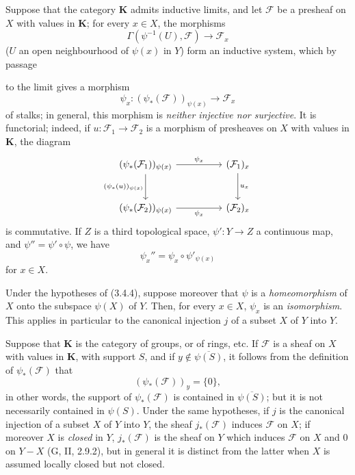 \begin{env}[3.4.4]
\label{0.3.4.4}
Suppose that the category $\mathbf{K}$ admits inductive limits, and let
$\mathcal{F}$ be a presheaf on $X$ with values in $\mathbf{K}$; for every
$x\in X$, the morphisms
\[
  \Gamma(\psi^{-1}(U),\mathcal{F})\to\mathcal{F}_x
\]
($U$ an open neighbourhood of $\psi(x)$ in $Y$) form an inductive system, which
by passage


to the limit gives a morphism
\[
  \psi_x:(\psi_*(\mathcal{F}))_{\psi(x)}\to\mathcal{F}_x
\]
of stalks; in general, this morphism is \emph{neither injective nor surjective}.
It is functorial; indeed, if
$u:\mathcal{F}_1\to\mathcal{F}_2$ is a morphism of presheaves on $X$ with
values in $\mathbf{K}$, the diagram
\[
\begin{tikzcd}[column sep=huge,row sep=large]
(\psi_*(\mathcal{F}_1))_{\psi(x)}
  \arrow[r,"\psi_x"] \arrow[d,"{(\psi_*(u))_{\psi(x)}}"']
  & (\mathcal{F}_1)_x \arrow[d,"u_x"] \\
(\psi_*(\mathcal{F}_2))_{\psi(x)}
  \arrow[r,"\psi_x"']
  & (\mathcal{F}_2)_x
\end{tikzcd}
\]
is commutative. If $Z$ is a third topological space,
$\psi':Y\to Z$ a continuous map, and $\psi''=\psi'\circ\psi$, we have
\[
  \psi_x''=\psi_x\circ\psi'_{\psi(x)}
\]
for $x\in X$.
\end{env}

\begin{env}[3.4.5]
\label{0.3.4.5}
Under the hypotheses of (3.4.4), suppose moreover that $\psi$ is a
\emph{homeomorphism} of $X$ onto the subspace $\psi(X)$ of $Y$. Then, for
every $x\in X$, $\psi_x$ is an \emph{isomorphism}. This applies in
particular to the canonical injection $j$ of a subset $X$ of $Y$ into $Y$.
\end{env}

\begin{env}[3.4.6]
\label{0.3.4.6}
Suppose that $\mathbf{K}$ is the category of groups, or of rings, etc.
If $\mathcal{F}$ is a sheaf on $X$ with values in $\mathbf{K}$, with
support $S$, and if $y\notin\overline{\psi(S)}$, it follows from the definition of
$\psi_*(\mathcal{F})$ that
\[
  (\psi_*(\mathcal{F}))_y=\{0\},
\]
in other words, the support of $\psi_*(\mathcal{F})$ is contained in
$\overline{\psi(S)}$; but it is not necessarily contained in
$\psi(S)$. Under the same hypotheses, if $j$ is the canonical injection of a
subset $X$ of $Y$ into $Y$, the sheaf $j_*(\mathcal{F})$ induces
$\mathcal{F}$ on $X$; if moreover $X$ is \emph{closed} in $Y$,
$j_*(\mathcal{F})$ is the sheaf on $Y$ which induces $\mathcal{F}$ on $X$
and $0$ on $Y-X$ (G, II, 2.9.2), but in general it is distinct from the latter
when $X$ is assumed locally closed but not closed.
\end{env}

